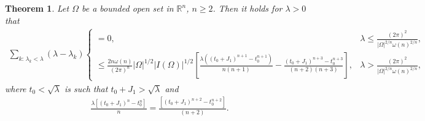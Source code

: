 \documentclass[11pt,twoside, leqno]{article}
\def\rr{{\mathbb R}}
\def\rn{{{\rr}^n}}
\newtheorem{thm}{Theorem}[section]
\numberwithin{equation}{section}
\begin{document}
\begin{thm}\label{Dirichlet-1}
Let $\Omega$ be a bounded open set in $\rn$, $n\ge 2$. Then it holds for $\lambda>0$ that
\begin{align*}
\sum_{k:\,\lambda_k<\lambda}(\lambda-\lambda_k)
\begin{cases}
=0, & \lambda\le \frac{(2\pi)^2}{|\Omega|^{2/n}\omega(n)^{2/n}},\\
\le   \frac{2n\omega(n)}{(2\pi)^{n}} |\Omega|^{1/2}|I(\Omega)|^{1/2}   \left[\frac{\lambda ((t_0+J_1)^{n+1}-t_0^{n+1})}{n(n+1)}-\frac{(t_0+J_1)^{n+3}-t_0^{n+3}}{(n+2)(n+3)}\right], & \lambda> \frac{(2\pi)^2}{|\Omega|^{2/n}\omega(n)^{2/n}},
\end{cases}
\end{align*}
where  $t_0<\sqrt\lambda$  is such that $t_0+J_1>\sqrt{\lambda}$ and
\begin{align*}
\frac{\lambda \left[(t_0+J_1)^{n}-t_0^{n}\right]}{n}=\frac{\left[(t_0+J_1)^{n+2}-t_0^{n+2}\right]}{(n+2)}.
\end{align*}
\end{thm}
\end{document}
